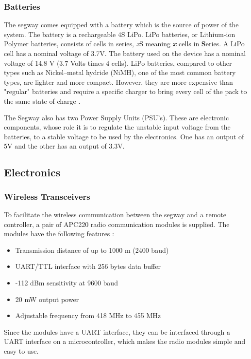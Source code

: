 \subsubsection{Batteries}
The segway comes equipped with a battery which is the source of power of the system. The battery is a rechargeable 4S LiPo. LiPo batteries, or Lithium-ion Polymer batteries, consists of cells in series, \textit{x}S meaning \textbf{\textit{x}} cells in \textbf{S}eries. A LiPo cell has a nominal voltage of 3.7V. The battery used on the device has a nominal voltage of 14.8 V (3.7 Volts times 4 cells).
LiPo batteries, compared to other types such as Nickel–metal hydride (NiMH), one of the most common battery types, are lighter and more compact. However, they are more expensive than "regular" batteries and require a specific charger to bring every cell of the pack to the same state of charge \citep{Cells}.

The Segway also has two Power Supply Units (PSU's). These are electronic components, whose role it is to regulate the unstable input voltage from the batteries, to a stable voltage to be used by the electronics.
One has an output of 5V and the other has an output of 3.3V. 

\pagebreak 
\subsection{Electronics}
\subsubsection{Wireless Transceivers}
To facilitate the wireless communication between the segway and a remote controller, a pair of APC220 radio communication modules is supplied.
The modules have the following features \citep{wifimodule}:
\begin{itemize}
\item Transmission distance of up to 1000 m (2400 baud)
\item UART/TTL interface with 256 bytes data buffer
\item -112 dBm sensitivity at 9600 baud
\item 20 mW output power
\item Adjustable frequency from 418 MHz to 455 MHz
\end{itemize}

Since the modules have a UART interface, they can be interfaced through a UART interface on a microcontroller, which makes the radio modules simple and easy to use.

